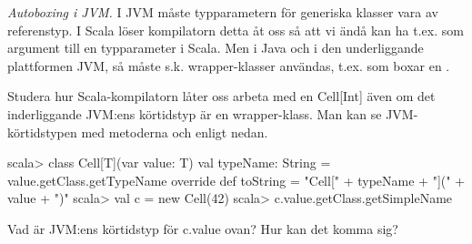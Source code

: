 

\Exercise{\ExeWeekELEVEN}

\begin{Goals}
\item 
\end{Goals}

\begin{Preparations}
\item 
\end{Preparations}

\BasicTasks %

\Task \emph{Autoboxing i JVM.} I JVM måste typparametern för generiska klasser vara av referenstyp. I Scala löser kompilatorn detta åt oss så att vi ändå kan ha t.ex.  som argument till en typparameter i Scala. Men i Java och i den underliggande plattformen JVM, så måste s.k. wrapper-klasser användas, t.ex.  som boxar en .

\Subtask Studera hur Scala-kompilatorn låter oss arbeta med en Cell[Int] även om det inderliggande JVM:ens körtidstyp  är en wrapper-klass. Man kan se JVM-körtidstypen med metoderna  och  enligt nedan.
\begin{REPL}
scala> class Cell[T](var value: T){
         val typeName: String = value.getClass.getTypeName
         override def toString = "Cell[" + typeName + "](" + value + ")"
       }
scala> val c = new Cell(42)
scala> c.value.getClass.getSimpleName
\end{REPL}

\Subtask Vad är JVM:ens körtidstyp för c.value ovan? Hur kan det komma sig? 


\Subtask 

\ExtraTasks %

\Task 

\AdvancedTasks %

\Task     
    